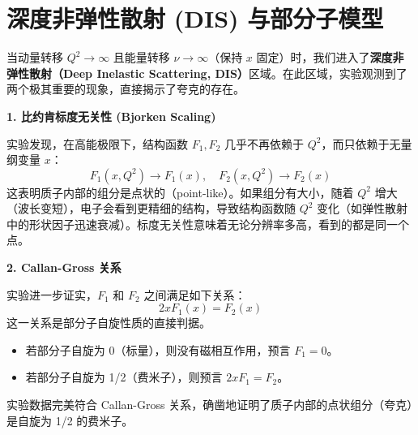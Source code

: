 \section{深度非弹性散射 (DIS) 与部分子模型}

当动量转移 $Q^2 \to \infty$ 且能量转移 $\nu \to \infty$（保持 $x$ 固定）时，我们进入了\textbf{深度非弹性散射（Deep Inelastic Scattering, DIS）}区域。在此区域，实验观测到了两个极其重要的现象，直接揭示了夸克的存在。

\textbf{1. 比约肯标度无关性 (Bjorken Scaling)}

实验发现，在高能极限下，结构函数 $F_1, F_2$ 几乎不再依赖于 $Q^2$，而只依赖于无量纲变量 $x$：
\begin{equation}
    F_1(x, Q^2) \to F_1(x), \quad F_2(x, Q^2) \to F_2(x)
\end{equation}
这表明质子内部的组分是点状的（point-like）。如果组分有大小，随着 $Q^2$ 增大（波长变短），电子会看到更精细的结构，导致结构函数随 $Q^2$ 变化（如弹性散射中的形状因子迅速衰减）。标度无关性意味着无论分辨率多高，看到的都是同一个点。

\textbf{2. Callan-Gross 关系}

实验进一步证实，$F_1$ 和 $F_2$ 之间满足如下关系：
\begin{equation}
    2x F_1(x) = F_2(x)
\end{equation}
这一关系是部分子自旋性质的直接判据。
\begin{itemize}
    \item 若部分子自旋为 0（标量），则没有磁相互作用，预言 $F_1 = 0$。
    \item 若部分子自旋为 1/2（费米子），则预言 $2x F_1 = F_2$。
\end{itemize}
实验数据完美符合 Callan-Gross 关系，确凿地证明了质子内部的点状组分（夸克）是自旋为 1/2 的费米子。

